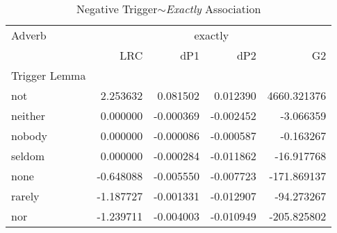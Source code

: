 
\begin{table}[ht]
\caption{Negative Trigger$\sim$\textit{Exactly} Association}
\label{trigger-exactly-AM}
\begin{tabular}{lrrrr}
\toprule
Adverb & \multicolumn{4}{|c|}{exactly} \\
 & LRC & dP1 & dP2 & G2 \\
Trigger Lemma &  &  &  &  \\
\midrule
not & {\cellcolor[HTML]{67001F}} \color[HTML]{F1F1F1} 2.253632 & {\cellcolor[HTML]{67001F}} \color[HTML]{F1F1F1} 0.081502 & {\cellcolor[HTML]{67001F}} \color[HTML]{F1F1F1} 0.012390 & {\cellcolor[HTML]{67001F}} \color[HTML]{F1F1F1} 4660.321376 \\
neither & {\cellcolor[HTML]{FCD5BF}} \color[HTML]{000000} 0.000000 & {\cellcolor[HTML]{78B4D5}} \color[HTML]{000000} -0.000369 & {\cellcolor[HTML]{DBEAF2}} \color[HTML]{000000} -0.002452 & {\cellcolor[HTML]{A5CEE3}} \color[HTML]{000000} -3.066359 \\
nobody & {\cellcolor[HTML]{FCD5BF}} \color[HTML]{000000} 0.000000 & {\cellcolor[HTML]{7BB6D6}} \color[HTML]{000000} -0.000086 & {\cellcolor[HTML]{F6F7F7}} \color[HTML]{000000} -0.000587 & {\cellcolor[HTML]{A5CEE3}} \color[HTML]{000000} -0.163267 \\
seldom & {\cellcolor[HTML]{FCD5BF}} \color[HTML]{000000} 0.000000 & {\cellcolor[HTML]{78B4D5}} \color[HTML]{000000} -0.000284 & {\cellcolor[HTML]{175290}} \color[HTML]{F1F1F1} -0.011862 & {\cellcolor[HTML]{A2CDE3}} \color[HTML]{000000} -16.917768 \\
none & {\cellcolor[HTML]{F7F6F6}} \color[HTML]{000000} -0.648088 & {\cellcolor[HTML]{529DC8}} \color[HTML]{F1F1F1} -0.005550 & {\cellcolor[HTML]{569FC9}} \color[HTML]{F1F1F1} -0.007723 & {\cellcolor[HTML]{96C7DF}} \color[HTML]{000000} -171.869137 \\
rarely & {\cellcolor[HTML]{D4E6F1}} \color[HTML]{000000} -1.187727 & {\cellcolor[HTML]{71B0D3}} \color[HTML]{F1F1F1} -0.001331 & {\cellcolor[HTML]{0C3D73}} \color[HTML]{F1F1F1} -0.012907 & {\cellcolor[HTML]{9DCBE1}} \color[HTML]{000000} -94.273267 \\
nor & {\cellcolor[HTML]{D1E5F0}} \color[HTML]{000000} -1.239711 & {\cellcolor[HTML]{5FA5CD}} \color[HTML]{F1F1F1} -0.004003 & {\cellcolor[HTML]{2065AB}} \color[HTML]{F1F1F1} -0.010949 & {\cellcolor[HTML]{90C4DD}} \color[HTML]{000000} -205.825802 \\

\end{tabular}
\end{table}

